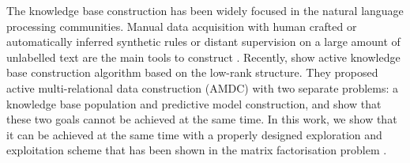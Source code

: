 The knowledge base construction has been widely focused in the natural 
language processing communities. Manual data acquisition with human crafted 
or automatically inferred synthetic rules or distant supervision on a large
amount of unlabelled text are the main tools to construct \cite{fader2011identifying,Mintz2009}.
Recently, \citet{kajino2015active} show active knowledge base construction
algorithm based on the low-rank structure. They proposed active 
multi-relational data construction (AMDC) with two separate problems: 
a knowledge base population and predictive model construction, and show 
that these two goals cannot be achieved at the same time. In this work, 
we show that it can be achieved at the same time with a properly designed
exploration and exploitation scheme that has been shown in the matrix 
factorisation problem \cite{kawale2015efficient}.



